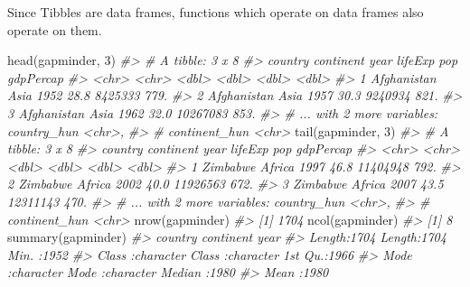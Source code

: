 \documentclass[
]{book}
\newenvironment{Shaded}{\begin{snugshade}}{\end{snugshade}}
\newcommand{\CommentTok}[1]{\textcolor[rgb]{0.56,0.35,0.01}{\textit{#1}}}
\newcommand{\DecValTok}[1]{\textcolor[rgb]{0.00,0.00,0.81}{#1}}
\newcommand{\FunctionTok}[1]{\textcolor[rgb]{0.00,0.00,0.00}{#1}}
\newcommand{\NormalTok}[1]{#1}
\begin{document}
Since Tibbles are data frames, functions which operate on data frames also operate on them.

\begin{Shaded}
\begin{Highlighting}[]
\FunctionTok{head}\NormalTok{(gapminder, }\DecValTok{3}\NormalTok{)}
\CommentTok{\#\textgreater{} \# A tibble: 3 x 8}
\CommentTok{\#\textgreater{}   country     continent  year lifeExp      pop gdpPercap}
\CommentTok{\#\textgreater{}   \textless{}chr\textgreater{}       \textless{}chr\textgreater{}     \textless{}dbl\textgreater{}   \textless{}dbl\textgreater{}    \textless{}dbl\textgreater{}     \textless{}dbl\textgreater{}}
\CommentTok{\#\textgreater{} 1 Afghanistan Asia       1952    28.8  8425333      779.}
\CommentTok{\#\textgreater{} 2 Afghanistan Asia       1957    30.3  9240934      821.}
\CommentTok{\#\textgreater{} 3 Afghanistan Asia       1962    32.0 10267083      853.}
\CommentTok{\#\textgreater{} \# ... with 2 more variables: country\_hun \textless{}chr\textgreater{},}
\CommentTok{\#\textgreater{} \#   continent\_hun \textless{}chr\textgreater{}}
\FunctionTok{tail}\NormalTok{(gapminder, }\DecValTok{3}\NormalTok{)}
\CommentTok{\#\textgreater{} \# A tibble: 3 x 8}
\CommentTok{\#\textgreater{}   country  continent  year lifeExp      pop gdpPercap}
\CommentTok{\#\textgreater{}   \textless{}chr\textgreater{}    \textless{}chr\textgreater{}     \textless{}dbl\textgreater{}   \textless{}dbl\textgreater{}    \textless{}dbl\textgreater{}     \textless{}dbl\textgreater{}}
\CommentTok{\#\textgreater{} 1 Zimbabwe Africa     1997    46.8 11404948      792.}
\CommentTok{\#\textgreater{} 2 Zimbabwe Africa     2002    40.0 11926563      672.}
\CommentTok{\#\textgreater{} 3 Zimbabwe Africa     2007    43.5 12311143      470.}
\CommentTok{\#\textgreater{} \# ... with 2 more variables: country\_hun \textless{}chr\textgreater{},}
\CommentTok{\#\textgreater{} \#   continent\_hun \textless{}chr\textgreater{}}
\FunctionTok{nrow}\NormalTok{(gapminder)}
\CommentTok{\#\textgreater{} [1] 1704}
\FunctionTok{ncol}\NormalTok{(gapminder)}
\CommentTok{\#\textgreater{} [1] 8}
\FunctionTok{summary}\NormalTok{(gapminder)}
\CommentTok{\#\textgreater{}    country           continent              year     }
\CommentTok{\#\textgreater{}  Length:1704        Length:1704        Min.   :1952  }
\CommentTok{\#\textgreater{}  Class :character   Class :character   1st Qu.:1966  }
\CommentTok{\#\textgreater{}  Mode  :character   Mode  :character   Median :1980  }
\CommentTok{\#\textgreater{}                                        Mean   :1980  }

\end{Highlighting}
\end{Shaded}
\end{document}
